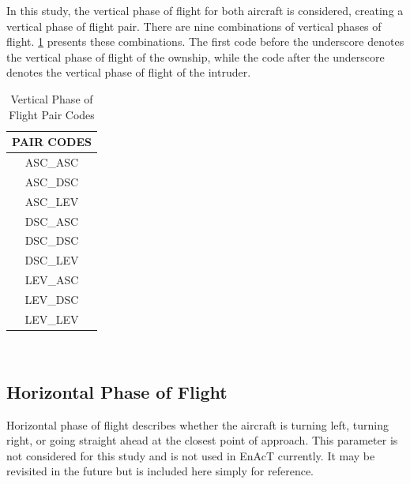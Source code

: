 In this study, the vertical phase of flight for both aircraft is considered, creating a vertical phase of flight pair. There are nine combinations of vertical phases of flight. \ref{table:vpof} presents these combinations. The first code before the underscore denotes the vertical phase of flight of the ownship, while the code after the underscore denotes the vertical phase of flight of the intruder.

\begin{table}[H]
\caption{Vertical Phase of Flight Pair Codes}
\label{table:vpof}
\begin{center}
\begin{tabular}{|c|} 
    \hline
    \textbf{PAIR CODES} \\
    \hline
    ASC\_ASC \\
    \hline
    ASC\_DSC \\
    \hline
    ASC\_LEV \\
    \hline
    DSC\_ASC \\
    \hline
    DSC\_DSC \\
    \hline
    DSC\_LEV \\
    \hline
    LEV\_ASC \\
    \hline
    LEV\_DSC \\
    \hline
    LEV\_LEV \\
    \hline
\end{tabular}
\end{center}
\end{table}
~\\

\subsection{Horizontal Phase of Flight}
Horizontal phase of flight describes whether the aircraft is turning left, turning right, or going straight ahead at the closest point of approach. This parameter is not considered for this study and is not used in EnAcT currently. It may be revisited in the future but is included here simply for reference.
